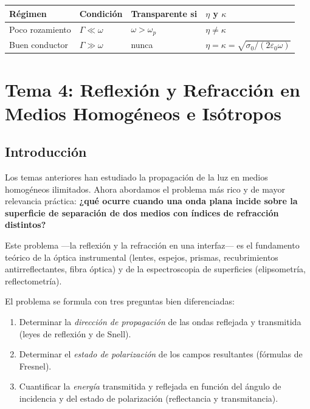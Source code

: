 \documentclass[12pt, a4paper]{article}
\theoremstyle{plain}
\theoremstyle{definition}
\theoremstyle{remark}
\begin{document}
\begin{center}
\begin{tabularx}{0.98\linewidth}{@{}L{2.6cm}L{2.4cm}L{2.7cm}Y@{}}
  \toprule
  Régimen & Condición & Transparente si & $\eta$ y $\kappa$ \\
  \midrule
  Poco rozamiento & $\Gamma\ll\omega$ & $\omega>\omega_p$ & $\eta\neq\kappa$ \\
  Buen conductor  & $\Gamma\gg\omega$ & nunca & $\eta=\kappa=\sqrt{\sigma_0/(2\varepsilon_0\omega)}$ \\
  \bottomrule
\end{tabularx}
\end{center}

\section{Tema 4: Reflexión y Refracción en Medios Homogéneos e Isótropos}

\subsection{Introducción}

Los temas anteriores han estudiado la propagación de la luz en medios
homogéneos ilimitados. Ahora abordamos el problema más rico y de mayor
relevancia práctica: \textbf{¿qué ocurre cuando una onda plana incide sobre
la superficie de separación de dos medios con índices de refracción distintos?}

Este problema —la reflexión y la refracción en una interfaz— es el fundamento
teórico de la óptica instrumental (lentes, espejos, prismas, recubrimientos
antirreflectantes, fibra óptica) y de la espectroscopia de superficies
(elipsometría, reflectometría).

El problema se formula con tres preguntas bien diferenciadas:
\begin{enumerate}
  \item Determinar la \emph{dirección de propagación} de las ondas reflejada
        y transmitida (leyes de reflexión y de Snell).
  \item Determinar el \emph{estado de polarización} de los campos resultantes
        (fórmulas de Fresnel).
  \item Cuantificar la \emph{energía} transmitida y reflejada en función del
        ángulo de incidencia y del estado de polarización (reflectancia y
        transmitancia).
\end{enumerate}
\end{document}
